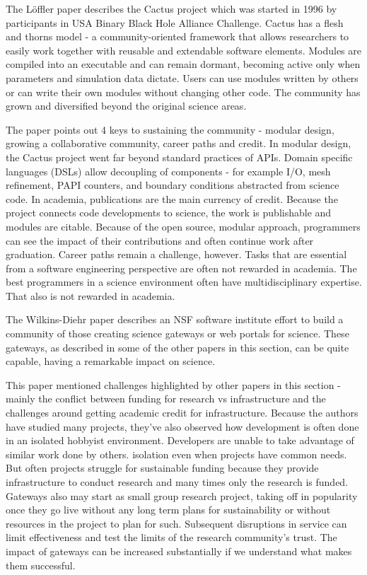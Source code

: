 \documentclass[11pt, oneside]{amsart}
\begin{document}
The L\"{o}ffler paper describes the Cactus project which was started in 1996 by participants in USA Binary Black Hole Alliance
Challenge. Cactus has a flesh and thorns model - a community-oriented framework that allows researchers to easily work
together with reusable and extendable software elements. Modules are compiled into an executable and can remain dormant, becoming
active only when parameters and simulation data dictate. Users can  use modules written by others or can write their own
modules without changing other code. The community has grown and diversified beyond the original science areas.

The paper points out 4 keys to sustaining the community - modular design, growing a collaborative community, career paths and credit.
In modular design, the Cactus project went far beyond standard practices of APIs.
Domain specific languages (DSLs) allow decoupling of components - for example I/O, mesh refinement, PAPI counters, and
boundary conditions abstracted from science code. In academia, publications are the main currency of credit. Because the
project connects code developments to science, the work is
publishable and modules are citable. Because of the open source, modular approach, programmers can see the impact of their contributions and often continue
work after graduation. Career paths remain a challenge, however. Tasks that are essential from a software engineering perspective
are often not rewarded in academia. The best programmers in a science environment often have multidisciplinary expertise.
That also is not rewarded in academia.

The Wilkins-Diehr paper describes an NSF software institute effort to build a community of those creating science gateways or
web portals for science. These gateways, as described in some of the other papers in this section, can be quite capable, having a
remarkable impact on science.

This paper mentioned challenges highlighted by other papers in this section - mainly the conflict between funding for research
vs infrastructure and the challenges around getting academic credit for infrastructure. Because the authors have studied
many projects, they've also observed how development is often done in an isolated hobbyist environment. Developers are unable
to take advantage of similar work done by others. isolation even when projects have common needs.
But often projects struggle for sustainable funding because they provide infrastructure to conduct
research and many times only the research is funded. Gateways also may start as small group research project, taking off in popularity
once they go live without any long term plans for sustainability or without resources in the project to plan for such.
Subsequent disruptions in service can limit effectiveness and test the limits of the research community's trust. The impact
of gateways can be increased substantially if we understand what makes them successful.
\end{document}
